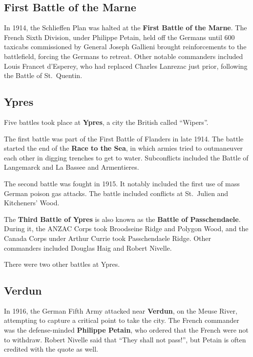 \subsection*{First Battle of the Marne}

In 1914, the Schlieffen Plan was halted at the \textbf{First Battle of the Marne}.
The French Sixth Division, under Philippe Petain,
held off the Germans until 600 taxicabs commissioned by General Joseph Gallieni
brought reinforcements to the battlefield,
forcing the Germans to retreat.
Other notable commanders included Louis Francet d'Esperey,
who had replaced Charles Lanrezac just prior, following the Battle of St.\ Quentin.

\subsection*{Ypres}

Five battles took place at \textbf{Ypres}, a city the British called ``Wipers''.

The first battle was part of the First Battle of Flanders in late 1914.
The battle started the end of the \textbf{Race to the Sea},
in which armies tried to outmaneuver each other in digging trenches to get to water.
Subconflicts included the Battle of Langemarck and La Bassee and Armentieres.

The second battle was fought in 1915.
It notably included the first use of mass German poison gas attacks.
The battle included conflicts at St.\ Julien and Kitcheners' Wood.

The \textbf{Third Battle of Ypres} is also known as the \textbf{Battle of Passchendaele}.
During it, the ANZAC Corps took Broodseine Ridge and Polygon Wood,
and the Canada Corps under Arthur Currie took Passchendaele Ridge.
Other commanders included Douglas Haig and Robert Nivelle.

There were two other battles at Ypres.

\subsection*{Verdun}

In 1916, the German Fifth Army attacked near \textbf{Verdun}, on the Meuse River,
attempting to capture a critical point to take the city.
The French commander was the defense-minded \textbf{Philippe Petain},
who ordered that the French were not to withdraw.
Robert Nivelle said that ``They shall not pass!'', but Petain is often credited with the quote as well.

